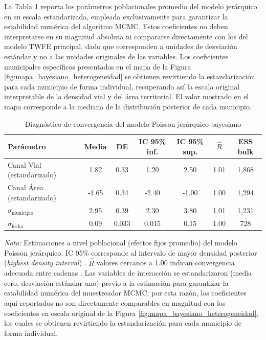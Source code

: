 \documentclass[
  spanish,
  12pt,
  letterpaper]{article}
\begin{document}
La Tabla \ref{tab:diagnostico_bayes} reporta los parámetros
poblacionales promedio del modelo jerárquico en su escala estandarizada,
empleada exclusivamente para garantizar la estabilidad numérica del
algoritmo MCMC. Estos coeficientes no deben interpretarse en su magnitud
absoluta ni compararse directamente con los del modelo TWFE principal,
dado que corresponden a unidades de desviación estándar y no a las
unidades originales de las variables. Los coeficientes municipales
específicos presentados en el mapa de la Figura
\ref{fig:mapa_bayesiano_heterogeneidad} se obtienen revirtiendo la
estandarización para cada municipio de forma individual, recuperando así
la escala original interpretable de la densidad vial y del área
territorial. El valor mostrado en el mapa corresponde a la mediana de la
distribución posterior de cada municipio.

\begin{table}[H]
\centering
\small
\begin{threeparttable}
\caption{Diagnóstico de convergencia del modelo Poisson jerárquico bayesiano}
\label{tab:diagnostico_bayes}
\begin{tabular}{l c c c c c c}
\toprule
\textbf{Parámetro} & \textbf{Media} & \textbf{DE} & \textbf{IC 95\% inf.} & \textbf{IC 95\% sup.} & $\hat{R}$ & \textbf{ESS bulk} \\
\midrule
Canal Vial (estandarizado) & 1.82 & 0.33 & 1.20 & 2.50 & 1.01 & 1{,}868 \\
Canal Área (estandarizado) & -1.65 & 0.34 & -2.40 & -1.00 & 1.00 & 1{,}294 \\
$\sigma_{\text{municipio}}$ & 2.95 & 0.39 & 2.30 & 3.80 & 1.01 & 1{,}231 \\
$\sigma_{\text{fecha}}$ & 0.09 & 0.033 & 0.015 & 0.15 & 1.00 & 728 \\
\bottomrule
\end{tabular}
\begin{tablenotes}
\small
\item \textit{Nota:} Estimaciones a nivel poblacional (efectos fijos promedio) del modelo Poisson jerárquico. IC 95\% corresponde al intervalo de mayor densidad posterior (\textit{highest density interval}) \parencite{kumar2019arviz}. $\hat{R}$ valores cercanos a 1.00 indican convergencia adecuada entre cadenas \parencite{gelman2006data}. Las variables de interacción se estandarizaron (media cero, desviación estándar uno) previo a la estimación para garantizar la estabilidad numérica del muestreador MCMC; por esta razón, los coeficientes aquí reportados no son directamente comparables en magnitud con los coeficientes en escala original de la Figura \ref{fig:mapa_bayesiano_heterogeneidad}, los cuales se obtienen revirtiendo la estandarización para cada municipio de forma individual.
\end{tablenotes}
\end{threeparttable}
\end{table}
\end{document}
